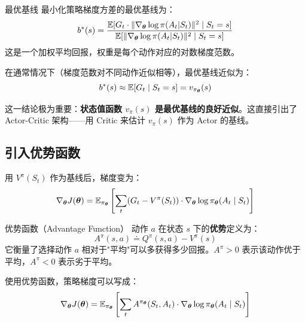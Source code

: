 \begin{myTheorem}{最优基线}
最小化策略梯度方差的最优基线为：
$$b^*(s) = \frac{\mathbb{E}[G_t \cdot \|\nabla_{\boldsymbol{\theta}} \log \pi(A_t|S_t)\|^2 \mid S_t = s]}{\mathbb{E}[\|\nabla_{\boldsymbol{\theta}} \log \pi(A_t|S_t)\|^2 \mid S_t = s]}$$
这是一个加权平均回报，权重是每个动作对应的对数梯度范数。

在通常情况下（梯度范数对不同动作近似相等），最优基线近似为：
$$b^*(s) \approx \mathbb{E}[G_t \mid S_t = s] = v_{\pi_{\boldsymbol{\theta}}}(s)$$
\end{myTheorem}

\begin{remark}
这一结论极为重要：\textbf{状态值函数 $v_{\pi}(s)$ 是最优基线的良好近似}。这直接引出了 Actor-Critic 架构——用 Critic 来估计 $v_{\pi}(s)$ 作为 Actor 的基线。
\end{remark}

\subsection{引入优势函数}

用 $V^{\pi}(S_t)$ 作为基线后，梯度变为：
$$\nabla_{\boldsymbol{\theta}} J(\boldsymbol{\theta}) = \mathbb{E}_{\pi_{\boldsymbol{\theta}}}\left[ \sum_{t} (G_t - V^{\pi}(S_t)) \cdot \nabla_{\boldsymbol{\theta}} \log \pi_{\boldsymbol{\theta}}(A_t \mid S_t) \right]$$

\begin{mydefinition}{优势函数（Advantage Function）}
动作 $a$ 在状态 $s$ 下的\textbf{优势}定义为：
$$A^{\pi}(s,a) \doteq Q^{\pi}(s,a) - V^{\pi}(s)$$
它衡量了选择动作 $a$ 相对于"平均"可以多获得多少回报。$A^{\pi} > 0$ 表示该动作优于平均，$A^{\pi} < 0$ 表示劣于平均。
\end{mydefinition}

使用优势函数，策略梯度可以写成：
$$\nabla_{\boldsymbol{\theta}} J(\boldsymbol{\theta}) = \mathbb{E}_{\pi_{\boldsymbol{\theta}}}\left[ \sum_{t} A^{\pi_{\boldsymbol{\theta}}}(S_t, A_t) \cdot \nabla_{\boldsymbol{\theta}} \log \pi_{\boldsymbol{\theta}}(A_t \mid S_t) \right]$$

